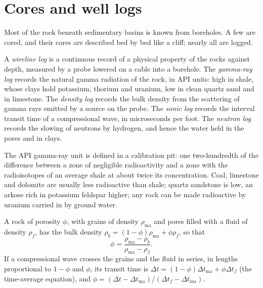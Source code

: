\section{Cores and well logs}\label{sec:b3:facies-models:logs}

Most of the rock beneath sedimentary basins is known from boreholes. A few
are cored, and their cores are described bed by bed like a cliff; nearly all
are logged.

\begin{definition}\label{def:b3:facies-models:wireline}
A \emph{wireline log} is a continuous record of a
physical property of the rocks against depth, measured by a probe lowered on
a cable into a borehole. The \emph{gamma-ray log}
records the natural gamma radiation of the rock, in API units: high in
shale, whose clays hold potassium, thorium and uranium, low in clean
quartz sand and in limestone. The \emph{density log}
records the bulk density from the scattering of gamma rays emitted by a
source on the probe. The \emph{sonic log} records the
interval transit time of a compressional wave, in microseconds per foot. The
\emph{neutron log} records the slowing of neutrons by
hydrogen, and hence the water held in the pores and in clays.
\end{definition}

The API gamma-ray unit is defined in a calibration pit: one two-hundredth of
the difference between a zone of negligible radioactivity and a zone with
the radioisotopes of an average shale at about twice its concentration. Coal,
limestone and dolomite are usually less radioactive than shale; quartz
sandstone is low, an arkose rich in potassium feldspar higher; any rock can be
made radioactive by uranium carried in by ground water.

\begin{proposition}\label{prop:b3:facies-models:porosity}
A rock of porosity $\phi$, with grains of density $\rho_{\mathrm{ma}}$ and
pores filled with a fluid of density $\rho_f$, has the bulk density
$\rho_b = (1 - \phi)\rho_{\mathrm{ma}} + \phi\rho_f$, so that
\[
\phi = \frac{\rho_{\mathrm{ma}} - \rho_b}{\rho_{\mathrm{ma}} - \rho_f}.
\]
If a compressional wave crosses the grains and the fluid in series, in
lengths proportional to $1 - \phi$ and $\phi$, its transit time is
$\Delta t = (1 - \phi)\Delta t_{\mathrm{ma}} + \phi\Delta t_f$ (the
time-average equation), and $\phi = (\Delta t - \Delta
t_{\mathrm{ma}})/(\Delta t_f - \Delta t_{\mathrm{ma}})$.
\end{proposition}

